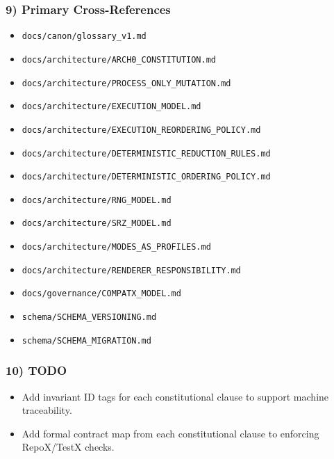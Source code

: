 \documentclass[9pt,a4paper,openany]{book}
\begin{document}
\subsubsection{9) Primary Cross-References}
\begin{itemize}
\item \texttt{docs/\allowbreak{}canon/\allowbreak{}glossary\_\allowbreak{}v1.\allowbreak{}md}
\item \texttt{docs/\allowbreak{}architecture/\allowbreak{}ARCH0\_\allowbreak{}CONSTITUTION.\allowbreak{}md}
\item \texttt{docs/\allowbreak{}architecture/\allowbreak{}PROCESS\_\allowbreak{}ONLY\_\allowbreak{}MUTATION.\allowbreak{}md}
\item \texttt{docs/\allowbreak{}architecture/\allowbreak{}EXECUTION\_\allowbreak{}MODEL.\allowbreak{}md}
\item \texttt{docs/\allowbreak{}architecture/\allowbreak{}EXECUTION\_\allowbreak{}REORDERING\_\allowbreak{}POLICY.\allowbreak{}md}
\item \texttt{docs/\allowbreak{}architecture/\allowbreak{}DETERMINISTIC\_\allowbreak{}REDUCTION\_\allowbreak{}RULES.\allowbreak{}md}
\item \texttt{docs/\allowbreak{}architecture/\allowbreak{}DETERMINISTIC\_\allowbreak{}ORDERING\_\allowbreak{}POLICY.\allowbreak{}md}
\item \texttt{docs/\allowbreak{}architecture/\allowbreak{}RNG\_\allowbreak{}MODEL.\allowbreak{}md}
\item \texttt{docs/\allowbreak{}architecture/\allowbreak{}SRZ\_\allowbreak{}MODEL.\allowbreak{}md}
\item \texttt{docs/\allowbreak{}architecture/\allowbreak{}MODES\_\allowbreak{}AS\_\allowbreak{}PROFILES.\allowbreak{}md}
\item \texttt{docs/\allowbreak{}architecture/\allowbreak{}RENDERER\_\allowbreak{}RESPONSIBILITY.\allowbreak{}md}
\item \texttt{docs/\allowbreak{}governance/\allowbreak{}COMPATX\_\allowbreak{}MODEL.\allowbreak{}md}
\item \texttt{schema/\allowbreak{}SCHEMA\_\allowbreak{}VERSIONING.\allowbreak{}md}
\item \texttt{schema/\allowbreak{}SCHEMA\_\allowbreak{}MIGRATION.\allowbreak{}md}
\end{itemize}

\subsubsection{10) TODO}
\begin{itemize}
\item Add invariant ID tags for each constitutional clause to support machine traceability.\allowbreak{}
\item Add formal contract map from each constitutional clause to enforcing RepoX/\allowbreak{}TestX checks.\allowbreak{}
\end{itemize}
\end{document}
